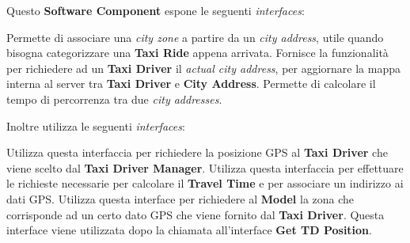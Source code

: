 \begin{itemize}
\begin{itemize}
		 Questo \textbf{Software Component} espone le seguenti \textit{interfaces}:
		\begin{itemize}
			 Permette di associare una \textit{city zone} a partire da un \textit{city address}, utile quando bisogna categorizzare una \textbf{Taxi Ride} appena arrivata.
			 Fornisce la funzionalità per richiedere ad un \textbf{Taxi Driver} il \textit{actual city address}, per aggiornare la mappa interna al server tra \textbf{Taxi Driver} e \textbf{City Address}.
			 Permette di calcolare il tempo di percorrenza tra due \textit{city addresses}.
		\end{itemize}
		Inoltre utilizza le seguenti \textit{interfaces}:
		\begin{itemize}
			 Utilizza questa interfaccia per richiedere la posizione GPS al \textbf{Taxi Driver} che viene scelto dal \textbf{Taxi Driver Manager}.
			 Utilizza questa interfaccia per effettuare le richieste necessarie per calcolare il \textbf{Travel Time} e per associare un indirizzo ai dati GPS.	
			 Utilizza questa interface per richiedere al \textbf{Model} la zona che corrisponde ad un certo dato GPS che viene fornito dal \textbf{Taxi Driver}. 
			Questa interface viene utilizzata dopo la chiamata all'interface \textbf{Get TD Position}.
		\end{itemize}
		

\end{itemize}
\end{itemize}
